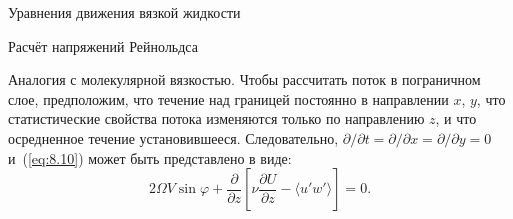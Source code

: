 \begin{chapter}{Уравнения движения вязкой жидкости}
\begin{section}{Расчёт напряжений Рейнольдса}
\begin{paragraph}{Аналогия с молекулярной вязкостью.}
Чтобы рассчитать поток в пограничном слое, предположим, что течение 
над границей постоянно в направлении $x$, $y$, что
статистические свойства потока изменяются только по направлению $z$, и
что осредненное течение установившееся. Следовательно,
$\partial /\partial t = \partial /\partial x = \partial /\partial y = 0$
и~(\ref{eq:8.10}) может быть представлено в виде:
\begin{equation}
2 \Omega V \sin \varphi + \frac{\partial }{\partial z} 
 \left[\nu \frac{\partial U}{\partial z} - \langle u'w'\rangle \right] = 0.
\end{equation}
%


\end{paragraph}
\end{section}
\end{chapter}
